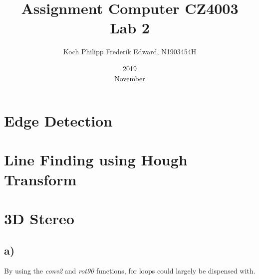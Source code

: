 \documentclass{article}
\title{Assignment Computer CZ4003 \\ Lab 2}
\date{2019 \\ November}
\author{Koch Philipp Frederik Edward, N1903454H}
\begin{document}
	
	\maketitle
	
	\section{Edge Detection}
	\section{Line Finding using Hough Transform}
	\section{3D Stereo}
	\subsection{a)} 
	By using the \textit{conv2} and \textit{rot90} functions, for loops could largely be dispensed with. 
	
	
	
\end{document}
